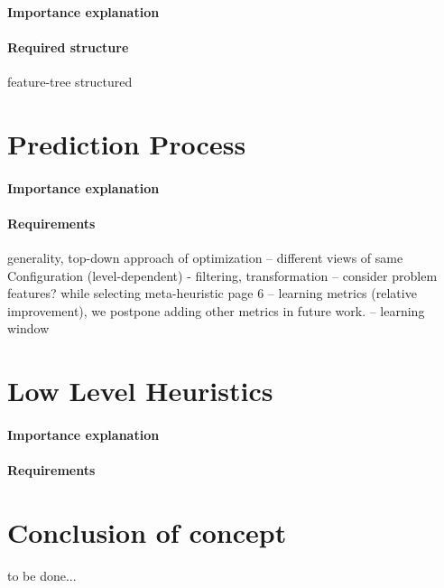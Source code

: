 \paragraph{Importance explanation}
\paragraph{Required structure} feature-tree structured



\section{Prediction Process}\label{concept:prediction}
\paragraph{Importance explanation}
\paragraph{Requirements} generality, top-down approach of optimization
-- different views of same Configuration (level-dependent) - filtering, transformation
-- consider problem features? while selecting meta-heuristic \cite{kerschke2019automated} page 6
-- learning metrics (relative improvement), we postpone adding other metrics in future work.
-- learning window


\section{Low Level Heuristics}\label{concept:llh}
\paragraph{Importance explanation}
\paragraph{Requirements}


\section{Conclusion of concept}
to be done...